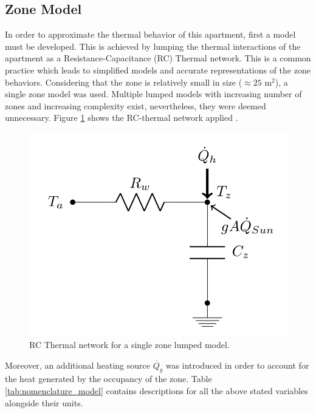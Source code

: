 \subsection{Zone Model}
\label{subsec:zone_model}
In order to approximate the thermal behavior of this apartment, first a model must be developed. This is achieved by lumping the thermal interactions of the apartment as a Resistance-Capacitance (RC) Thermal network. This is a common practice which leads to simplified models and accurate representations of the zone behaviors. Considering that the zone is relatively small in size ($\approx25$ m$^2$), a single zone model was used. Multiple lumped models with increasing number of zones and increasing complexity exist, nevertheless, they were deemed unnecessary. Figure \ref{fig:single_zone} shows the RC-thermal network applied \cite{drgovna2020all}.

\begin{figure}[H]
\centering
\includegraphics[scale=0.5]{images/single_zone.png}
\caption{RC Thermal network for a single zone lumped model.}
\label{fig:single_zone}
\end{figure}

Moreover, an additional heating source $\dot{Q_g}$ was introduced in order to account for the heat generated by the occupancy of the zone. Table \ref{tab:nomenclature_model} contains descriptions for all the above stated variables alongside their units.

